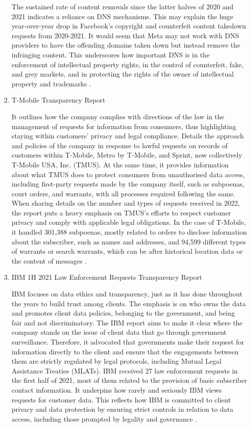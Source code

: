 \begin{enumerate}
The sustained rate of content removals since the latter halves of 2020 and 2021 indicates a reliance on DNS mechanisms. This may explain the huge year-over-year drop in Facebook's copyright and counterfeit content takedown requests from 2020-2021. It would seem that Meta may not work with DNS providers to have the offending domains taken down but instead remove the infringing content. This underscores how important DNS is in the enforcement of intellectual property rights, in the control of counterfeit, fake, and grey markets, and in protecting the rights of the owner of intellectual property and trademarks \cite{Facebook2023}.

\item  T-Mobile Transparency Report

It outlines how the company complies with directions of the law in the management of requests for information from consumers, thus highlighting staying within customers' privacy and legal compliance. Details the approach and policies of the company in response to lawful requests on records of customers within T-Mobile, Metro by T-Mobile, and Sprint, now collectively T-Mobile USA, Inc. (TMUS). At the same time, it provides information about what TMUS does to protect consumers from unauthorised data access, including first-party requests made by the company itself, such as subpoenas, court orders, and warrants, with all processes required following the same. When sharing details on the number and types of requests received in 2022, the report puts a heavy emphasis on TMUS's efforts to respect customer privacy and comply with applicable legal obligations. In the case of T-Mobile, it handled 301,388 subpoenas, mostly related to orders to disclose information about the subscriber, such as names and addresses, and 94,599 different types of warrants or search warrants, which can be after historical location data or the content of messages \cite{TMobile2022TransparencyReport}.

\item IBM 1H 2021 Law Enforcement Requests Transparency Report
 
 IBM focuses on data ethics and transparency, just as it has done throughout the years to build trust among clients. The emphasis is on who owns the data and promotes client data policies, belonging to the government, and being fair and not discriminatory. The IBM report aims to make it clear where the company stands on the issue of client data that go through government surveillance. Therefore, it advocated that governments make their request for information directly to the client and ensure that the engagements between them are strictly regulated by legal protocols, including Mutual Legal Assistance Treaties (MLATs). IBM received 27 law enforcement requests in the first half of 2021, most of them related to the provision of basic subscriber contact information. It underpins how rarely and seriously IBM views requests for customer data. This reflects how IBM is committed to client privacy and data protection by ensuring strict controls in relation to data access, including those prompted by legality and governance \cite{IBMTransparencyReport2023}.
 \vspace{25px}


\end{enumerate}
